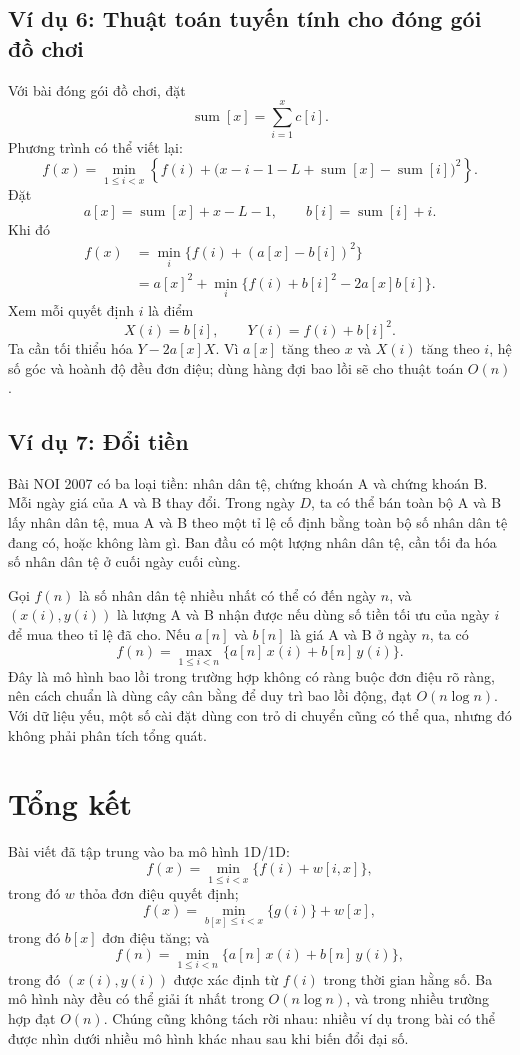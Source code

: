\documentclass[11pt]{article}
\begin{document}
\subsection{Ví dụ 6: Thuật toán tuyến tính cho đóng gói đồ chơi}

Với bài đóng gói đồ chơi, đặt
\[
  \operatorname{sum}[x]=\sum_{i=1}^{x}c[i].
\]
Phương trình có thể viết lại:
\[
  f(x)=
  \min_{1\le i<x}
  \left\{
    f(i)+
    \bigl(x-i-1-L+\operatorname{sum}[x]-\operatorname{sum}[i]\bigr)^2
  \right\}.
\]
Đặt
\[
  a[x]=\operatorname{sum}[x]+x-L-1,
  \qquad
  b[i]=\operatorname{sum}[i]+i.
\]
Khi đó
\[
\begin{aligned}
  f(x)
  &=\min_i \{f(i)+(a[x]-b[i])^2\}\\
  &=a[x]^2+\min_i\{f(i)+b[i]^2-2a[x]b[i]\}.
\end{aligned}
\]
Xem mỗi quyết định $i$ là điểm
\[
  X(i)=b[i],\qquad Y(i)=f(i)+b[i]^2.
\]
Ta cần tối thiểu hóa $Y-2a[x]X$. Vì $a[x]$ tăng theo $x$ và $X(i)$ tăng theo
$i$, hệ số góc và hoành độ đều đơn điệu; dùng hàng đợi bao lồi sẽ cho thuật
toán $O(n)$.

\subsection{Ví dụ 7: Đổi tiền}

Bài NOI 2007 có ba loại tiền: nhân dân tệ, chứng khoán A và chứng khoán B.
Mỗi ngày giá của A và B thay đổi. Trong ngày $D$, ta có thể bán toàn bộ A và
B lấy nhân dân tệ, mua A và B theo một tỉ lệ cố định bằng toàn bộ số nhân
dân tệ đang có, hoặc không làm gì. Ban đầu có một lượng nhân dân tệ, cần tối
đa hóa số nhân dân tệ ở cuối ngày cuối cùng.

Gọi $f(n)$ là số nhân dân tệ nhiều nhất có thể có đến ngày $n$, và $(x(i),y(i))$
là lượng A và B nhận được nếu dùng số tiền tối ưu của ngày $i$ để mua theo tỉ
lệ đã cho. Nếu $a[n]$ và $b[n]$ là giá A và B ở ngày $n$, ta có
\[
  f(n)=\max_{1\le i<n}\{a[n]\,x(i)+b[n]\,y(i)\}.
\]
Đây là mô hình bao lồi trong trường hợp không có ràng buộc đơn điệu rõ ràng,
nên cách chuẩn là dùng cây cân bằng để duy trì bao lồi động, đạt
$O(n\log n)$. Với dữ liệu yếu, một số cài đặt dùng con trỏ di chuyển cũng có
thể qua, nhưng đó không phải phân tích tổng quát.

\section{Tổng kết}

Bài viết đã tập trung vào ba mô hình 1D/1D:
\[
  f(x)=\min_{1\le i<x}\{f(i)+w[i,x]\},
\]
trong đó $w$ thỏa đơn điệu quyết định;
\[
  f(x)=\min_{b[x]\le i<x}\{g(i)\}+w[x],
\]
trong đó $b[x]$ đơn điệu tăng; và
\[
  f(n)=\min_{1\le i<n}\{a[n]\,x(i)+b[n]\,y(i)\},
\]
trong đó $(x(i),y(i))$ được xác định từ $f(i)$ trong thời gian hằng số.
Ba mô hình này đều có thể giải ít nhất trong $O(n\log n)$, và trong nhiều
trường hợp đạt $O(n)$. Chúng cũng không tách rời nhau: nhiều ví dụ trong bài
có thể được nhìn dưới nhiều mô hình khác nhau sau khi biến đổi đại số.
\end{document}
